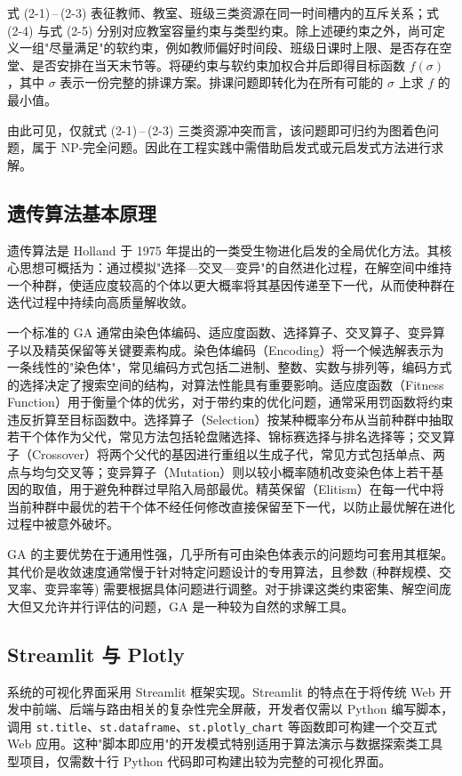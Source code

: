式 (2-1)\,--\,(2-3) 表征教师、教室、班级三类资源在同一时间槽内的互斥关系；式 (2-4) 与式 (2-5) 分别对应教室容量约束与类型约束。除上述硬约束之外，尚可定义一组"尽量满足"的软约束，例如教师偏好时间段、班级日课时上限、是否存在空堂、是否安排在当天末节等。将硬约束与软约束加权合并后即得目标函数 $f(\sigma)$，其中 $\sigma$ 表示一份完整的排课方案。排课问题即转化为在所有可能的 $\sigma$ 上求 $f$ 的最小值。

由此可见，仅就式 (2-1)\,--\,(2-3) 三类资源冲突而言，该问题即可归约为图着色问题，属于 NP-完全问题。因此在工程实践中需借助启发式或元启发式方法进行求解。

\subsection{遗传算法基本原理}

遗传算法是 Holland 于 1975 年提出的一类受生物进化启发的全局优化方法。其核心思想可概括为：通过模拟"选择—交叉—变异"的自然进化过程，在解空间中维持一个种群，使适应度较高的个体以更大概率将其基因传递至下一代，从而使种群在迭代过程中持续向高质量解收敛。

一个标准的 GA 通常由染色体编码、适应度函数、选择算子、交叉算子、变异算子以及精英保留等关键要素构成。染色体编码（Encoding）将一个候选解表示为一条线性的"染色体"，常见编码方式包括二进制、整数、实数与排列等，编码方式的选择决定了搜索空间的结构，对算法性能具有重要影响。适应度函数（Fitness Function）用于衡量个体的优劣，对于带约束的优化问题，通常采用罚函数将约束违反折算至目标函数中。选择算子（Selection）按某种概率分布从当前种群中抽取若干个体作为父代，常见方法包括轮盘赌选择、锦标赛选择与排名选择等；交叉算子（Crossover）将两个父代的基因进行重组以生成子代，常见方式包括单点、两点与均匀交叉等；变异算子（Mutation）则以较小概率随机改变染色体上若干基因的取值，用于避免种群过早陷入局部最优。精英保留（Elitism）在每一代中将当前种群中最优的若干个体不经任何修改直接保留至下一代，以防止最优解在进化过程中被意外破坏。

GA 的主要优势在于通用性强，几乎所有可由染色体表示的问题均可套用其框架。其代价是收敛速度通常慢于针对特定问题设计的专用算法，且参数 (种群规模、交叉率、变异率等) 需要根据具体问题进行调整。对于排课这类约束密集、解空间庞大但又允许并行评估的问题，GA 是一种较为自然的求解工具。

\subsection{Streamlit 与 Plotly}

系统的可视化界面采用 Streamlit 框架实现。Streamlit 的特点在于将传统 Web 开发中前端、后端与路由相关的复杂性完全屏蔽，开发者仅需以 Python 编写脚本，调用 \texttt{st.title}、\texttt{st.dataframe}、\texttt{st.plotly\_chart} 等函数即可构建一个交互式 Web 应用。这种"脚本即应用"的开发模式特别适用于算法演示与数据探索类工具型项目，仅需数十行 Python 代码即可构建出较为完整的可视化界面。

